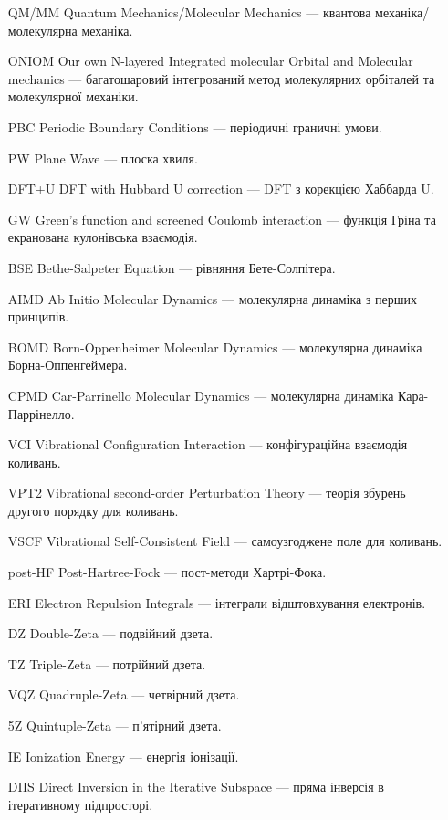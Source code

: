 \begin{enumerate}[
    leftmargin=10em,
    font=\bfseries,   %
    labelindent=5em,%
    leftmargin=*,     %
]
    \item[QM/MM] Quantum Mechanics/Molecular Mechanics --- квантова механіка/молекулярна механіка.
    \item[ONIOM] Our own N-layered Integrated molecular Orbital and Molecular mechanics --- багатошаровий інтегрований метод молекулярних орбіталей та молекулярної механіки.

    \item[PBC] Periodic Boundary Conditions --- періодичні граничні умови.
    \item[PW] Plane Wave --- плоска хвиля.

    \item[DFT+U] DFT with Hubbard U correction --- DFT з корекцією Хаббарда U.
    \item[GW] Green's function and screened Coulomb interaction --- функція Гріна та екранована кулонівська взаємодія.
    \item[BSE] Bethe-Salpeter Equation --- рівняння Бете-Солпітера.

    \item[AIMD] Ab Initio Molecular Dynamics --- молекулярна динаміка з перших принципів.
    \item[BOMD] Born-Oppenheimer Molecular Dynamics --- молекулярна динаміка Борна-Оппенгеймера.
    \item[CPMD] Car-Parrinello Molecular Dynamics --- молекулярна динаміка Кара-Паррінелло.

    \item[VCI] Vibrational Configuration Interaction --- конфігураційна взаємодія коливань.
    \item[VPT2] Vibrational second-order Perturbation Theory --- теорія збурень другого порядку для коливань.
    \item[VSCF] Vibrational Self-Consistent Field --- самоузгоджене поле для коливань.

    \item[post-HF] Post-Hartree-Fock --- пост-методи Хартрі-Фока.
    \item[ERI] Electron Repulsion Integrals --- інтеграли відштовхування електронів.
    \item[DZ] Double-Zeta --- подвійний дзета.
    \item[TZ] Triple-Zeta --- потрійний дзета.
    \item[VQZ] Quadruple-Zeta --- четвірний дзета.
    \item[5Z] Quintuple-Zeta --- п'ятірний дзета.
    \item[IE] Ionization Energy --- енергія іонізації.
    \item[DIIS] Direct Inversion in the Iterative Subspace --- пряма інверсія в ітеративному підпросторі.
\end{enumerate}